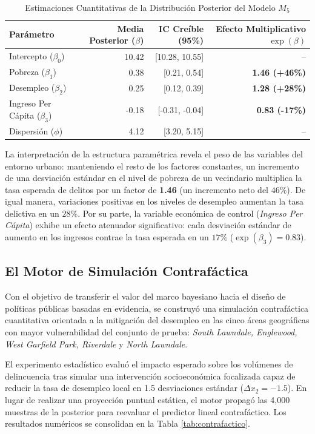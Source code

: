 \documentclass[11pt,a4paper]{article}
\begin{document}
\begin{table}[!ht]
\centering
\caption{Estimaciones Cuantitativas de la Distribución Posterior del Modelo $M_5$}
\label{tab:coeficientes_oficiales}
\begin{tabular}{lrrr}
\toprule
\textbf{Parámetro} & \textbf{Media Posterior ($\beta$)} & \textbf{IC Creíble (95\%)} & \textbf{Efecto Multiplicativo $\exp(\beta)$} \\
\midrule
Intercepto ($\beta_0$) & 10.42 & [10.28, 10.55] & -- \\
Pobreza ($\beta_1$) & 0.38 & [0.21, 0.54] & \textbf{1.46 (+46\%)} \\
Desempleo ($\beta_2$) & 0.25 & [0.12, 0.39] & \textbf{1.28 (+28\%)} \\
Ingreso Per Cápita ($\beta_3$) & -0.18 & [-0.31, -0.04] & \textbf{0.83 (-17\%)} \\
Dispersión ($\phi$) & 4.12 & [3.20, 5.15] & -- \\
\bottomrule
\end{tabular}
\end{table}

La interpretación de la estructura paramétrica revela el peso de las variables del entorno urbano: manteniendo el resto de los factores constantes, un incremento de una desviación estándar en el nivel de pobreza de un vecindario multiplica la tasa esperada de delitos por un factor de \textbf{1.46} (un incremento neto del $46\%$). De igual manera, variaciones positivas en los niveles de desempleo aumentan la tasa delictiva en un $28\%$. Por su parte, la variable económica de control (\textit{Ingreso Per Cápita}) exhibe un efecto atenuador significativo: cada desviación estándar de aumento en los ingresos contrae la tasa esperada en un $17\%$ ($\exp(\beta_3) = 0.83$).

\subsection{El Motor de Simulación Contrafáctica}
Con el objetivo de transferir el valor del marco bayesiano hacia el diseño de políticas públicas basadas en evidencia, se construyó una simulación contrafáctica cuantitativa orientada a la mitigación del desempleo en las cinco áreas geográficas con mayor vulnerabilidad del conjunto de prueba: \textit{South Lawndale, Englewood, West Garfield Park, Riverdale} y \textit{North Lawndale}.

El experimento estadístico evaluó el impacto esperado sobre los volúmenes de delincuencia tras simular una intervención socioeconómica focalizada capaz de reducir la tasa de desempleo local en 1.5 desviaciones estándar ($\Delta x_2 = -1.5$). En lugar de realizar una proyección puntual estática, el motor propagó las 4,000 muestras de la posterior para reevaluar el predictor lineal contrafáctico. Los resultados numéricos se consolidan en la Tabla \ref{tab:contrafactico}.
\end{document}
